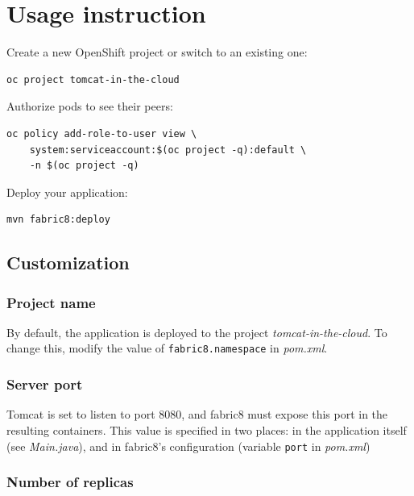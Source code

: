 \documentclass[11pt,a4paper]{article}
\begin{document}

\clearpage
\appendix
\section{Usage instruction}\label{sec:usage}

Create a new OpenShift project or switch to an existing one: \\
\begin{lstlisting}
oc project tomcat-in-the-cloud
\end{lstlisting}

Authorize pods to see their peers: \\
\begin{lstlisting}
oc policy add-role-to-user view \
    system:serviceaccount:$(oc project -q):default \
    -n $(oc project -q)
\end{lstlisting}

Deploy your application: \\
\begin{lstlisting}
mvn fabric8:deploy
\end{lstlisting}

\subsection*{Customization}

\subsubsection*{Project name}

By default, the application is deployed to the project \emph{tomcat-in-the-cloud}. To change this, modify the value of \texttt{fabric8.namespace} in \emph{pom.xml}.

\subsubsection*{Server port}

Tomcat is set to listen to port 8080, and fabric8 must expose this port in the resulting containers. This value is specified in two places: in the application itself (see \emph{Main.java}), and in fabric8's configuration (variable \texttt{port} in \emph{pom.xml})

\subsubsection*{Number of replicas}
\end{document}
